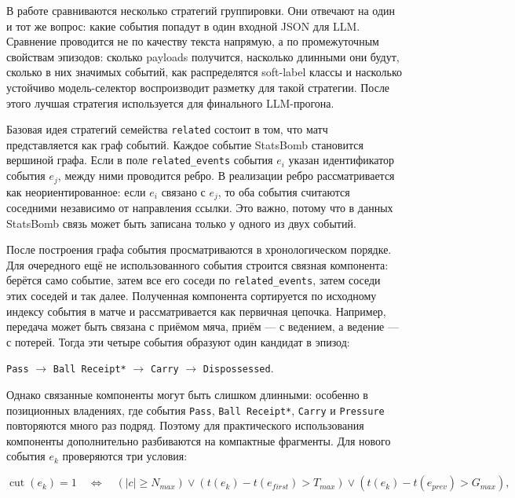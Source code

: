 \documentclass[a4paper,14pt]{extarticle}
\numberwithin{table}{section}
\numberwithin{figure}{section}
\numberwithin{equation}{section}
\begin{document}
В работе сравниваются несколько стратегий группировки. Они отвечают на один и тот же вопрос: какие события попадут в один входной JSON для LLM. Сравнение проводится не по качеству текста напрямую, а по промежуточным свойствам эпизодов: сколько payloads получится, насколько длинными они будут, сколько в них значимых событий, как распределятся soft-label классы и насколько устойчиво модель-селектор воспроизводит разметку для такой стратегии. После этого лучшая стратегия используется для финального LLM-прогона.

Базовая идея стратегий семейства \texttt{related} состоит в том, что матч представляется как граф событий. Каждое событие StatsBomb становится вершиной графа. Если в поле \texttt{related\_events} события $e_i$ указан идентификатор события $e_j$, между ними проводится ребро. В реализации ребро рассматривается как неориентированное: если $e_i$ связано с $e_j$, то оба события считаются соседними независимо от направления ссылки. Это важно, потому что в данных StatsBomb связь может быть записана только у одного из двух событий.

После построения графа события просматриваются в хронологическом порядке. Для очередного ещё не использованного события строится связная компонента: берётся само событие, затем все его соседи по \texttt{related\_events}, затем соседи этих соседей и так далее. Полученная компонента сортируется по исходному индексу события в матче и рассматривается как первичная цепочка. Например, передача может быть связана с приёмом мяча, приём --- с ведением, а ведение --- с потерей. Тогда эти четыре события образуют один кандидат в эпизод:

\begin{center}
\texttt{Pass} $\rightarrow$ \texttt{Ball Receipt*} $\rightarrow$ \texttt{Carry} $\rightarrow$ \texttt{Dispossessed}.
\end{center}

Однако связанные компоненты могут быть слишком длинными: особенно в позиционных владениях, где события \texttt{Pass}, \texttt{Ball Receipt*}, \texttt{Carry} и \texttt{Pressure} повторяются много раз подряд. Поэтому для практического использования компоненты дополнительно разбиваются на компактные фрагменты. Для нового события $e_k$ проверяются три условия:

\begin{equation}
\operatorname{cut}(e_k)=1 \quad \Longleftrightarrow \quad
\left(|c| \geq N_{max}\right)
\vee \left(t(e_k)-t(e_{first}) > T_{max}\right)
\vee \left(t(e_k)-t(e_{prev}) > G_{max}\right),
\label{eq:chain-cut}
\end{equation}
\end{document}
